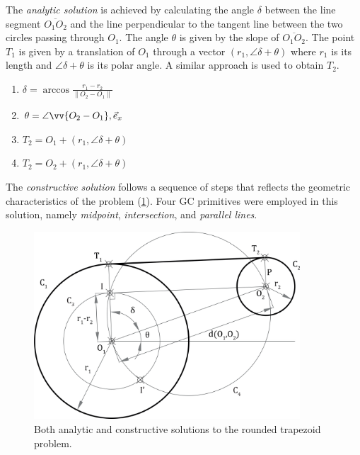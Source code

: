 The \textit{analytic solution} is achieved by calculating the angle $\delta$
between the line segment $\overline{O_1 O_2}$ and the line perpendicular to the
tangent line between the two circles passing through $O_1$.  The angle $\theta$
is given by the slope of $\overline{O_1 O_2}$.  The point $T_1$ is given by a
translation of $O_1$ through a vector $\left(r_1, \angle\delta + \theta\right)$
where $r_1$ is its length and $\angle\delta + \theta$ is its polar angle.  A
similar approach is used to obtain $T_2$.

\begin{enumerate}
  \item $\delta = \arccos\frac{r_1 - r_2}{\lVert O_2 - O_1 \rVert}$
  \item $\theta = \angle\vv{O_2 - O_1},\vec{e}_x$
  \item $T_2 = O_1 + \left(r_1, \angle\delta + \theta\right)$
  \item $T_2 = O_2 + \left(r_1, \angle\delta + \theta\right)$
\end{enumerate}

The \textit{constructive solution} follows a sequence of steps that reflects the
geometric characteristics of the problem
(\cref{fig:eval.studies.rtrapezoid.sol}).  Four \ac{GC} primitives were employed
in this solution, namely \textit{midpoint}, \textit{intersection}, and
\textit{parallel lines}.

\begin{figure}
  \centering
  \includegraphics[height=7cm]{fig/rtrapezoid-solution}
  \caption[Rounded trapezoid problem solution]{Both analytic and constructive
    solutions to the rounded trapezoid problem.}%
  \label{fig:eval.studies.rtrapezoid.sol}
\end{figure}

